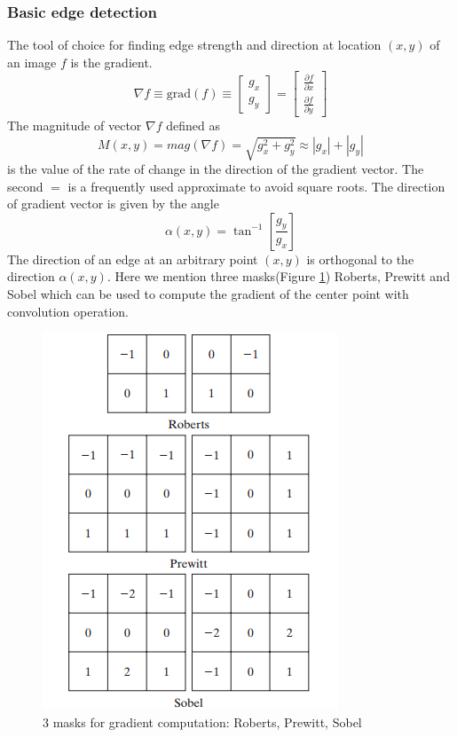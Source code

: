 \subsubsection{Basic edge detection}
The tool of choice for finding edge strength and direction at location $(x, y)$ of an image $f$ is the gradient. 
\begin{equation} \nabla f \equiv \text{grad}(f) \equiv \left[ \begin{array}{c} g_x \\ g_y \end{array}\right] = \left[ \begin{array}{c} \frac{\partial f}{\partial x} \\ \frac{\partial f}{\partial y} \end{array} \right] 
\end{equation}
The magnitude of vector $\nabla f$ defined as \begin{equation} \label{eq:magnitude} M(x,y)=mag(\nabla f) =  \sqrt{g_x^2 + g_y^2} \approx |g_x| + |g_y| \end{equation} is the value of the rate of change in the direction of the gradient vector. The second $=$ is a frequently used approximate to avoid square roots. The direction of gradient vector is given by the angle \begin{equation} \alpha(x,y)=\tan^{-1} \left[ \frac{g_y}{g_x} \right] \label{eq:angle} \end{equation}
The direction of an edge at an arbitrary point $(x,y)$ is orthogonal to the direction $\alpha(x,y)$. 
Here we mention three masks(Figure \ref{fig:3masks}) Roberts, Prewitt and Sobel which can be used to compute the gradient of the center point with convolution operation.
\begin{figure}[h!]
	\centering
	\includegraphics[scale=0.7]{myfigure/p9/3masks.png}
	\caption{3 masks for gradient computation: Roberts, Prewitt, Sobel}
	\label{fig:3masks}
\end{figure}

